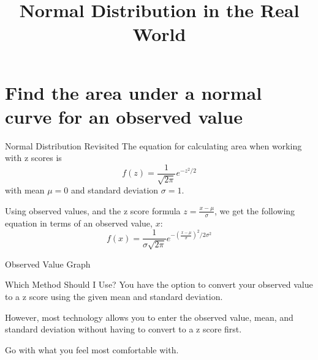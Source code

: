 \documentclass[t]{beamer}
\title{Normal Distribution in the Real World}
\author{}
\date{}
\begin{document}

\begin{frame} 
\maketitle
\end{frame}

\section{Find the area under a normal curve for an observed value}

\begin{frame}{Normal Distribution Revisited}
The equation for calculating area when working with z scores is
\[f(z) = \frac{1}{\sqrt{2\pi}} e^{-z^2/2}\]
with mean $\mu = 0$ and standard deviation $\sigma = 1$.	\newline\\	\pause

Using observed values, and the z score formula $z = \frac{x-\mu}{\sigma}$, we get the following equation in terms of an observed value, $x$:	\pause
\[f(x) = \frac{1}{\sigma\sqrt{2\pi}} e^{-\left(\frac{x-\mu}{\sigma}\right)^2/2\sigma^2}\]
\end{frame}

\begin{frame}[c]{Observed Value Graph}
\begin{center}
\end{center}
\end{frame}

\begin{frame}{Which Method Should I Use?}
You have the option to convert your observed value to a z score using the given mean and standard deviation.	\newline\\	\pause

However, most technology allows you to enter the observed value, mean, and standard deviation without having to convert to a z score first.	\newline\\	\pause

Go with what you feel most comfortable with.
\end{frame}
\end{document}
